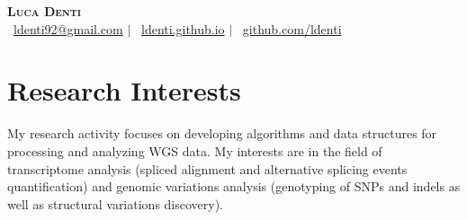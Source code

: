 \documentclass[letterpaper,11pt]{article}
\begin{document}

\begin{center}
    \textbf{\Huge \scshape Luca Denti} \\ \vspace{1pt}
    \Letter~\href{mailto:ldenti92@gmail.com}{ldenti92@gmail.com} $|$
    \faHome~\href{https://ldenti.github.io}{ldenti.github.io} $|$
    \faGithub~\href{https://github.com/ldenti}{github.com/ldenti}
\end{center}


\section{Research Interests}
My research activity focuses on developing algorithms and data structures for processing and analyzing WGS data. My interests are in the field of transcriptome analysis (spliced alignment and alternative splicing events quantification) and genomic variations analysis (genotyping of SNPs and indels as well as structural variations discovery).
\end{document}
